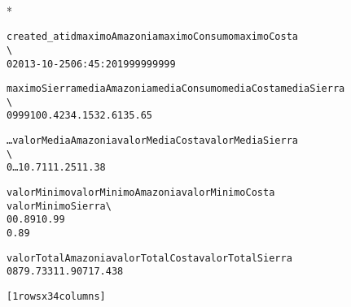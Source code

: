 \documentclass[letterpaper,10pt,english]{/usr/local/lib/python2.7/dist-packages/sphinx/texinputs/sphinxhowto}
\def\smaller{\fontsize{9.5pt}{9.5pt}\selectfont}
\newenvironment{InvisibleVerbatim}
        {\begin{mdframed}[leftmargin=0.1\linewidth,innerleftmargin=3pt,innerrightmargin=3pt, userdefinedwidth=1\linewidth, linewidth=0pt, linecolor=white, usetwoside=false]}
        {\end{mdframed}}
\begin{document}
    

        
        

            
                \makebox[0.1\linewidth]{\smaller\hfill\tt\color{nbframe-out-prompt}Out\hspace{4pt}{[}33{]}:\hspace{4pt}}\\*
                \vspace{-2.55\baselineskip}\begin{InvisibleVerbatim}
                \vspace{-0.5\baselineskip}
\begin{alltt}           created\_at  id  maximoAmazonia  maximoConsumo  maximoCosta
\textbackslash{}
0 2013-10-25 06:45:20   1             999            999          999

   maximoSierra  mediaAmazonia  mediaConsumo  mediaCosta  mediaSierra
\textbackslash{}
0           999         100.42         34.15       32.61        35.65

      \ldots       valorMediaAmazonia  valorMediaCosta  valorMediaSierra
\textbackslash{}
0     \ldots                    10.71            11.25             11.38

   valorMinimo  valorMinimoAmazonia  valorMinimoCosta
valorMinimoSierra  \textbackslash{}
0         0.89                    1              0.99
0.89

   valorTotalAmazonia valorTotalCosta  valorTotalSierra
0             879.733          11.907            17.438

[1 rows x 34 columns]\end{alltt}

            \end{InvisibleVerbatim}
            
        
    


\end{document}
